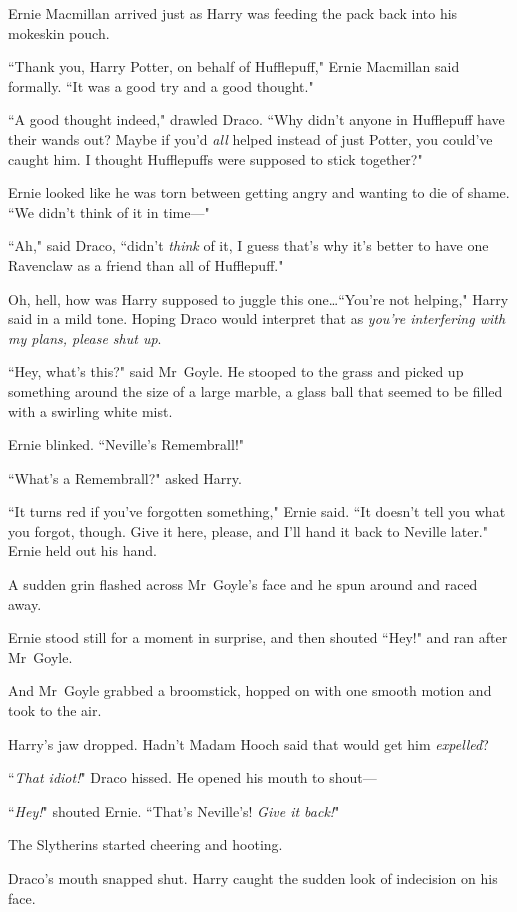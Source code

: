 Ernie Macmillan arrived just as Harry was feeding the pack back into his mokeskin pouch.

``Thank you, Harry Potter, on behalf of Hufflepuff," Ernie Macmillan said formally. ``It was a good try and a good thought."

``A good thought indeed," drawled Draco. ``Why didn't anyone in Hufflepuff have their wands out? Maybe if you'd \emph{all} helped instead of just Potter, you could've caught him. I thought Hufflepuffs were supposed to stick together?"

Ernie looked like he was torn between getting angry and wanting to die of shame. ``We didn't think of it in time—"

``Ah," said Draco, ``didn't \emph{think} of it, I guess that's why it's better to have one Ravenclaw as a friend than all of Hufflepuff."

Oh, hell, how was Harry supposed to juggle this one…``You're not helping," Harry said in a mild tone. Hoping Draco would interpret that as \emph{you're interfering with my plans, please shut up}.

``Hey, what's this?" said Mr~Goyle. He stooped to the grass and picked up something around the size of a large marble, a glass ball that seemed to be filled with a swirling white mist.

Ernie blinked. ``Neville's Remembrall!"

``What's a Remembrall?" asked Harry.

``It turns red if you've forgotten something," Ernie said. ``It doesn't tell you what you forgot, though. Give it here, please, and I'll hand it back to Neville later." Ernie held out his hand.

A sudden grin flashed across Mr~Goyle's face and he spun around and raced away.

Ernie stood still for a moment in surprise, and then shouted ``Hey!" and ran after Mr~Goyle.

And Mr~Goyle grabbed a broomstick, hopped on with one smooth motion and took to the air.

Harry's jaw dropped. Hadn't Madam Hooch said that would get him \emph{expelled}?

``\emph{That idiot!}" Draco hissed. He opened his mouth to shout—

``\emph{Hey!}" shouted Ernie. ``That's Neville's! \emph{Give it back!}"

The Slytherins started cheering and hooting.

Draco's mouth snapped shut. Harry caught the sudden look of indecision on his face.

